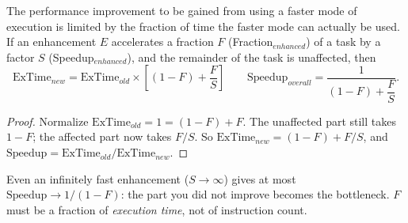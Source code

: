\begin{theorem}
The performance improvement to be gained from using a faster mode of
execution is limited by the fraction of time the faster mode can actually be
used. If an enhancement $E$ accelerates a fraction $F$ (Fraction$_{enhanced}$)
of a task by a factor $S$ (Speedup$_{enhanced}$), and the remainder of the
task is unaffected, then
\[
  \text{ExTime}_{new} = \text{ExTime}_{old} \times \left[(1-F) +
  \frac{F}{S}\right]
  \qquad
  \text{Speedup}_{overall} = \frac{1}{(1-F) + \dfrac{F}{S}}.
\]
\end{theorem}

\begin{proof}
Normalize $\text{ExTime}_{old}=1=(1-F)+F$. The unaffected part still takes
$1-F$; the affected part now takes $F/S$. So $\text{ExTime}_{new} =
(1-F)+F/S$, and $\text{Speedup} = \text{ExTime}_{old}/\text{ExTime}_{new}$.
\end{proof}

\begin{explanation}
Even an infinitely fast enhancement ($S\to\infty$) gives at most
$\text{Speedup}\to 1/(1-F)$: the part you did not improve becomes the
bottleneck. $F$ must be a fraction of \emph{execution time}, not of
instruction count.
\end{explanation}

\begin{center}\begin{minipage}{\linewidth}\centering
{}
\end{minipage}
\end{center}

